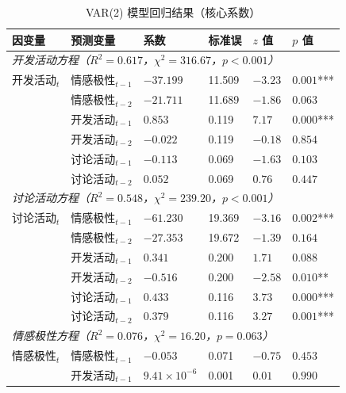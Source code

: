 \begin{table}[htbp]
    \centering
    \caption{VAR(2) 模型回归结果（核心系数）}
    \label{tab:var-results}
    \small
    \begin{tabularx}{\textwidth}{p{3.2cm}p{3.2cm}XXXX}
        \toprule
        因变量 & 预测变量 & 系数 & 标准误 & $z$ 值 & $p$ 值 \\
        \midrule
        \multicolumn{6}{l}{\textit{开发活动方程（$R^2 = 0.617$，$\chi^2 = 316.67$，$p < 0.001$）}} \\[2pt]
        开发活动$_t$ & 情感极性$_{t-1}$ & $-37.199$ & 11.509 & $-3.23$ & $0.001$*** \\
                 & 情感极性$_{t-2}$ & $-21.711$ & 11.689 & $-1.86$ & $0.063$ \\
                 & 开发活动$_{t-1}$      & $0.853$   & 0.119  & $7.17$  & $0.000$*** \\
                 & 开发活动$_{t-2}$      & $-0.022$  & 0.119  & $-0.18$ & $0.854$ \\
                 & 讨论活动$_{t-1}$   & $-0.113$  & 0.069  & $-1.63$ & $0.103$ \\
                 & 讨论活动$_{t-2}$   & $0.052$   & 0.069  & $0.76$  & $0.447$ \\[6pt]
        \multicolumn{6}{l}{\textit{讨论活动方程（$R^2 = 0.548$，$\chi^2 = 239.20$，$p < 0.001$）}} \\[2pt]
        讨论活动$_t$ & 情感极性$_{t-1}$ & $-61.230$ & 19.369 & $-3.16$ & $0.002$*** \\
                    & 情感极性$_{t-2}$ & $-27.353$ & 19.672 & $-1.39$ & $0.164$ \\
                    & 开发活动$_{t-1}$      & $0.341$   & 0.200  & $1.71$  & $0.088$ \\
                    & 开发活动$_{t-2}$      & $-0.516$  & 0.200  & $-2.58$ & $0.010$** \\
                    & 讨论活动$_{t-1}$   & $0.433$   & 0.116  & $3.73$  & $0.000$*** \\
                    & 讨论活动$_{t-2}$   & $0.379$   & 0.116  & $3.27$  & $0.001$*** \\[6pt]
        \multicolumn{6}{l}{\textit{情感极性方程（$R^2 = 0.076$，$\chi^2 = 16.20$，$p = 0.063$）}} \\[2pt]
        情感极性$_t$ & 情感极性$_{t-1}$ & $-0.053$ & 0.071 & $-0.75$ & $0.453$ \\
                      & 开发活动$_{t-1}$      & $9.41\times10^{-6}$ & 0.001 & $0.01$ & $0.990$ \\

\end{tabularx}
\end{table}
